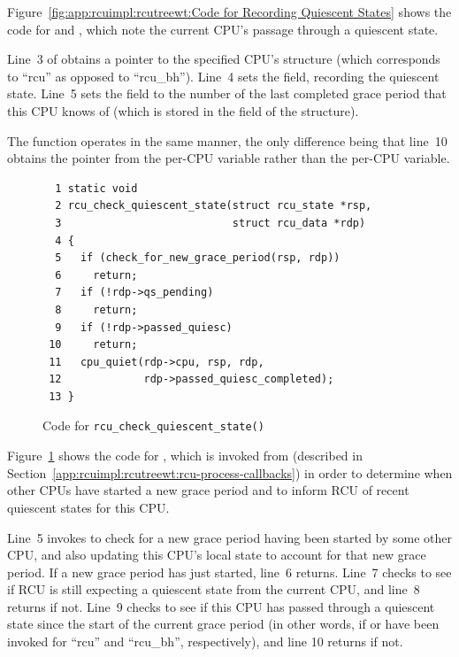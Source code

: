 Figure~\ref{fig:app:rcuimpl:rcutreewt:Code for Recording Quiescent States}
shows the code for  and ,
which note the current CPU's passage through a quiescent state.

Line~3 of  obtains a pointer to the specified
CPU's  structure (which corresponds to ``rcu'' as opposed
to ``rcu\_bh'').
Line~4 sets the  field, recording the
quiescent state.
Line~5 sets the  field to the number
of the last completed grace period that this CPU knows of (which is
stored in the  field of the 
structure).

The  function operates in the same manner,
the only difference being that line~10 obtains the 
pointer from the  per-CPU variable rather than
the  per-CPU variable.

\begin{figure}[tbp]
{ \scriptsize
\begin{verbatim}
  1 static void
  2 rcu_check_quiescent_state(struct rcu_state *rsp,
  3                           struct rcu_data *rdp)
  4 {
  5   if (check_for_new_grace_period(rsp, rdp))
  6     return;
  7   if (!rdp->qs_pending)
  8     return;
  9   if (!rdp->passed_quiesc)
 10     return;
 11   cpu_quiet(rdp->cpu, rsp, rdp,
 12             rdp->passed_quiesc_completed);
 13 }
\end{verbatim}
}
\caption{Code for {\tt rcu\_check\_quiescent\_state()}}
\label{fig:app:rcuimpl:rcutreewt:Code for rcu-check-quiescent-state}
\end{figure}

Figure~\ref{fig:app:rcuimpl:rcutreewt:Code for rcu-check-quiescent-state}
shows the code for , which is invoked
from 
(described in Section~\ref{app:rcuimpl:rcutreewt:rcu-process-callbacks})
in order to determine when other CPUs have started a new grace period
and to inform RCU of recent quiescent states for this CPU.

Line~5 invokes  to check for
a new grace period having been started by some other CPU, and also
updating this CPU's local state to account for that new grace period.
If a new grace period has just started, line~6 returns.
Line~7 checks to see if RCU is still expecting a quiescent state from
the current CPU, and line~8 returns if not.
Line~9 checks to see if this CPU has passed through a quiescent state
since the start of the current grace period (in other words, if
 or  have been invoked
for ``rcu'' and ``rcu\_bh'', respectively), and line 10 returns if not.


